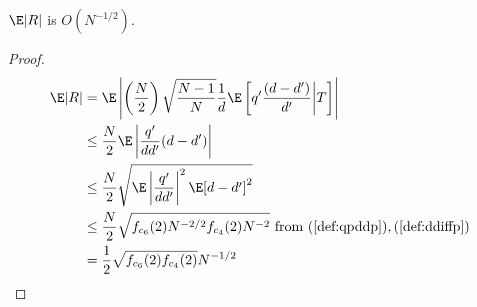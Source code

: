\begin{proposition}
  $\E|R|$ is $O(N^{-1/2})$.
\end{proposition}
\begin{proof}
  \begin{align*}
    \E|R| &= \E \left | \left (\frac{N}{2}\right )
      \sqrt{\frac{N-1}{N}}\frac{1}{d}\E
      \left [q'\frac{(d-d')}{d'} \middle | T \right ]\right | \\
    &\leq \frac{N}{2} \E \left | \frac{q'}{dd'}(d-d') \right | \\
    &\leq \frac{N}{2} \sqrt{\E \left | \frac{q'}{dd'} \right |^2
      \E[d-d']^2} \\
    &\leq \frac{N}{2} \sqrt{f_{c_6}(2) N^{-2/2} f_{c_4}(2) N^{-2}}
    \text{ from } (\ref{def:qpddp}), (\ref{def:ddiffp}) \\
    &=\frac{1}{2}\sqrt{f_{c_6}(2)f_{c_4}(2)} N^{-1/2}
  \end{align*}
\end{proof}


